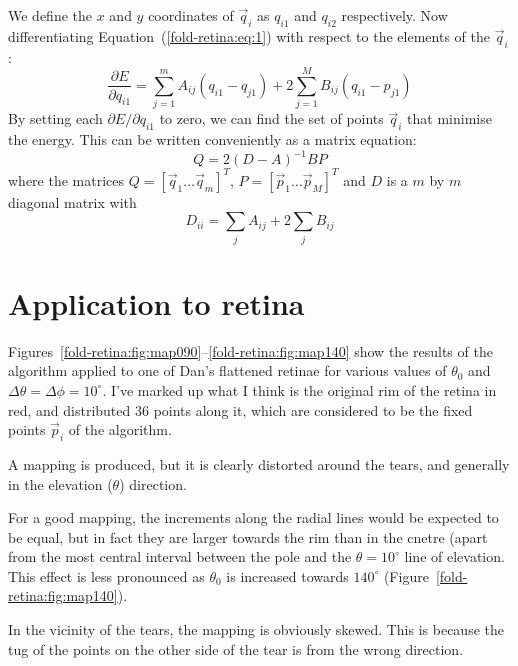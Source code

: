\documentclass{article}
\begin{document}
We define the $x$ and $y$ coordinates of $\vec{q}_i$ as $q_{i1}$ and
$q_{i2}$ respectively. Now
 differentiating Equation~(\ref{fold-retina:eq:1}) with respect to
the elements of the $\vec{q}_i$:
\begin{equation}
  \label{fold-retina:eq:5}
  \frac{\partial E}{\partial q_{i1}} = 
  \sum_{j=1}^m A_{ij} (q_{i1} - q_{j1}) 
  + 2\sum_{j=1}^M B_{ij} (q_{i1} - p_{j1}) 
\end{equation}
By setting each $\partial E/\partial q_{i1}$ to zero, we can find the
set of points $\vec{q}_i$ that minimise the energy. This can be
written conveniently as a matrix equation:
\begin{equation}
  \label{fold-retina:eq:3}
  Q = 2(D - A)^{-1}BP
\end{equation}
where the matrices $Q=[ \vec{q}_1 \dots \vec{q}_m]^T$, $P=[ \vec{p}_1
\dots \vec{p}_M]^T$ and $D$ is a $m$ by $m$  diagonal matrix with
\begin{equation}
  \label{fold-retina:eq:4}
  D_{ii} = \sum_j A_{ij} + 2\sum_j B_{ij}
\end{equation}

\section{Application to retina}
\label{fold-retina:sec:application-retina}

Figures~\ref{fold-retina:fig:map090}--\ref{fold-retina:fig:map140}
show the results of the algorithm applied to one of Dan's flattened
retinae for various values of $\theta_0$ and $\Delta\theta=\Delta\phi=10^\circ$. I've marked up what I think is the original rim of the retina
in red, and distributed 36 points along it, which are considered to be
the fixed points $\vec{p}_i$ of the algorithm.

A mapping is produced, but it is clearly distorted around the tears,
and generally in the elevation ($\theta$) direction.

For a good mapping, the increments along the radial lines would be
expected to be equal, but in fact they are larger towards the rim than
in the cnetre (apart from the most central interval between the pole
and the $\theta=10^\circ$ line of elevation. This effect is less
pronounced as $\theta_0$ is increased towards $140^\circ$
(Figure~\ref{fold-retina:fig:map140}).

In the vicinity of the tears, the mapping is obviously skewed. This is
because the tug of the points on the other side of the tear is from
the wrong direction.
\end{document}
